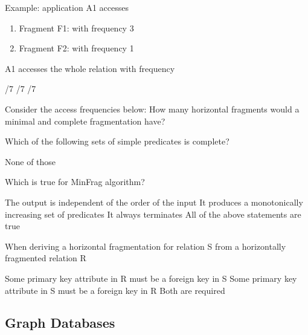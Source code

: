 \documentclass[12pt,a4paper]{exam} %
\begin{document}
\begin{questions}
\question Example: application A1 accesses
\begin{enumerate}
\item Fragment F1: with frequency 3
\item Fragment F2: with frequency 1
\end{enumerate}
A1 accesses the whole relation with frequency
\begin{checkboxes}
/7
/7
/7
\end{checkboxes}

\question Consider the access frequencies below:
How many horizontal fragments would a minimal and complete fragmentation have?
\begin{checkboxes}
\end{checkboxes}

\question Which of the following sets of simple predicates is complete?
\begin{checkboxes}
\CorrectChoice None of those
\end{checkboxes}

\question Which is true for MinFrag algorithm?
\begin{checkboxes}
\choice The output is independent of the order of the input
\choice It produces a monotonically increasing set of predicates
\CorrectChoice It always terminates
\choice All of the above statements are true
\end{checkboxes}


\question When deriving a horizontal fragmentation for relation S from a horizontally fragmented relation R
\begin{checkboxes}
\CorrectChoice Some primary key attribute in R must be a foreign key in S
\choice Some primary key attribute in S must be a foreign key in R
\choice Both are required
\end{checkboxes}

\end{questions}

\subsection{Graph Databases} %
\end{document}
